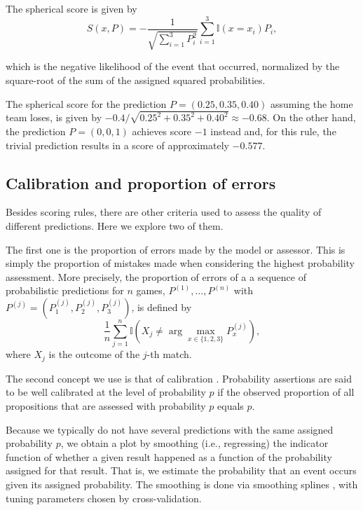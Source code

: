 \documentclass[journal,article,accept,moreauthors,pdftex,12pt,a4paper]{mdpi}
\begin{document}
	The spherical score is given by
	$$S(x,P)=- \frac{1}{\sqrt{\sum_{i=1}^3 P^2_i}}\sum_{i=1}^3\mathbb{I}(x=x_i)P_i,$$
	
	\noindent
	which is the negative likelihood of the event that occurred, normalized by the square-root of the sum of the assigned squared probabilities.
	
	The spherical score for the prediction 
		$P=(0.25,0.35,0.40)$ assuming the home team loses, is given by
	$-0.4/\sqrt{0.25^2+0.35^2+0.40^2} \approx -0.68$.
	On the other hand, the prediction $P=(0,0,1)$ achieves score  $-1$ instead and, for this rule, the trivial prediction results in a score of approximately $-0.577$.
	
	\subsection{Calibration and proportion of errors}
	\label{sec::calib}
	
	Besides scoring rules, there are other criteria used to assess the quality of different predictions. Here we explore two of them.
	
	The first one is the proportion of errors made by the model or assessor. This is simply the proportion of mistakes made when considering the highest probability assessment.
	More precisely, the proportion of errors of a a sequence of probabilistic predictions for $n$ games, $P^{(1)},\ldots,P^{(n)}$
	with
		$P^{(j)}=(P^{(j)}_1,P^{(j)}_2,P^{(j)}_3)$, is defined by
	$$\frac{1}{n}\sum_{j=1}^n \mathbb{I}\left(X_j \neq \arg \max_{x \in \{1,2,3\}} P^{(j)}_x\right),$$
	where $X_j$ is the outcome of the $j$-th match.
	
	The second concept we use is that of calibration \cite{Dawid}. Probability assertions are said to be well calibrated at the level of probability $p$ if the observed proportion of all propositions that are assessed with probability $p$ equals $p$.
	
	Because we typically do not have several predictions with the same assigned probability $p$, we obtain a plot by smoothing (i.e., regressing) the indicator function of whether a given result happened as a function of the probability assigned for that result.
	That is, we estimate the probability that an event occurs given its assigned probability.
	The smoothing is done via smoothing splines \cite{wahba}, with tuning parameters chosen by cross-validation.
	
\end{document}
